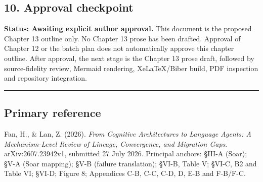 \subsection{10. Approval checkpoint}\label{approval-checkpoint}

\textbf{Status: Awaiting explicit author approval.} This document is the proposed Chapter 13 outline only. No Chapter 13 prose has been drafted. Approval of Chapter 12 or the batch plan does not automatically approve this chapter outline. After approval, the next stage is the Chapter 13 prose draft, followed by source-fidelity review, Mermaid rendering, XeLaTeX/Biber build, PDF inspection and repository integration.

\begin{center}\rule{0.5\linewidth}{0.5pt}\end{center}

\subsection{Primary reference}\label{primary-reference}

Fan, H., \& Lan, Z. (2026). \emph{From Cognitive Architectures to Language Agents: A Mechanism-Level Review of Lineage, Convergence, and Migration Gaps}. arXiv:2607.23942v1, submitted 27 July 2026. Principal anchors: §III-A (Soar); §V-A (Soar mapping); §V-B (failure translation); §VI-B, Table V; §VI-C, B2 and Table VI; §VI-D; Figure 8; Appendices C-B, C-C, C-D, D, E-B and F-B/F-C.

